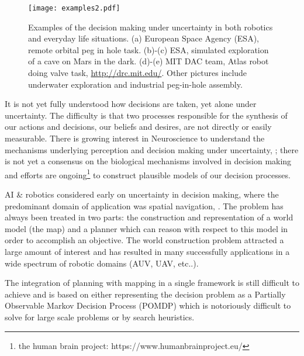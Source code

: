 \begin{figure}
 \centering
 \texttt{[image: examples2.pdf]}
 \caption{Examples of the decision making under uncertainty in both robotics and everyday life situations. (a) European Space Agency (ESA), remote orbital peg in hole task. (b)-(c) 
 ESA, simulated exploration of a cave on Mars in the dark. (d)-(e) MIT DAC team, Atlas robot doing valve task, \url{http://drc.mit.edu/}. Other pictures include underwater 
 exploration and industrial peg-in-hole assembly.}
\end{figure}

It is not yet fully understood how decisions are taken, yet alone under uncertainty. The difficulty is that two processes responsible 
for the synthesis of our actions and decisions, our beliefs and desires, are not directly or easily measurable. There is growing interest in 
Neuroscience to understand the mechanisms underlying perception and decision making under uncertainty, \cite{decision_un_2013}; there is not 
yet a consensus on the biological mechanisms involved in decision making and efforts are 
ongoing\footnote{the human brain project: https://www.humanbrainproject.eu/} to construct plausible models of our decision processes. 



AI \& robotics considered early on uncertainty in decision making, 
where the predominant domain of application was spatial navigation, \cite{ActingUncertainty_1996}. The problem has 
always been treated in two parts: the construction and representation of a world model (the map) and a planner which can reason with 
respect to this model in order to accomplish an objective. The world construction problem attracted a large amount of 
interest and has resulted in many successfully applications in a wide spectrum of robotic domains (AUV, UAV, etc..). 

The integration of planning with mapping in a single framework is still difficult to achieve and is based on either 
representing the decision problem as a Partially Observable Markov Decision Process (POMDP) which is notoriously difficult 
to solve for large scale problems or by search heuristics.  



